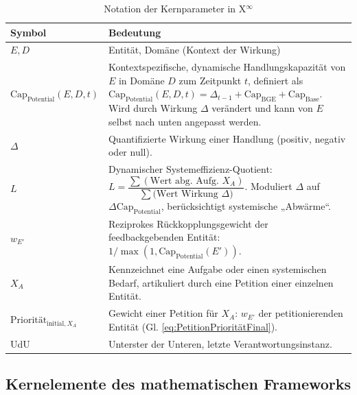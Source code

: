 \documentclass[12pt]{scrartcl}
\begin{document}
\begin{table}[ht]
\centering\caption{Notation der Kernparameter in X$^\infty$}
\begin{tabular}{p{3.0cm} >{\raggedright\arraybackslash}p{10.0cm}}
\toprule
Symbol & Bedeutung \\
\midrule
$E, D$ & Entität, Domäne (Kontext der Wirkung) \\
$\text{Cap}_{\text{Potential}}(E,D,t)$ & Kontextspezifische, dynamische Handlungskapazität von $E$ in Domäne $D$ zum Zeitpunkt $t$, definiert als $\text{Cap}_{\text{Potential}}(E,D,t) = \Delta_{t-1} + \text{Cap}_{\text{BGE}} + \text{Cap}_{\text{Base}}$. Wird durch Wirkung $\Delta$ verändert und kann von $E$ selbst nach unten angepasst werden. \\
$\Delta$ & Quantifizierte Wirkung einer Handlung (positiv, negativ oder null). \\
$L$ & Dynamischer Systemeffizienz-Quotient: $L = \dfrac{\sum (\text{Wert abg. Aufg. } X_A)}{\sum (\text{Wert Wirkung } \Delta\text{)}}$. Moduliert $\Delta$ auf $\Delta\text{Cap}_{\text{Potential}}$, berücksichtigt systemische „Abwärme“. \\
$w_{E'}$ & Reziprokes Rückkopplungsgewicht der feedbackgebenden Entität: $1 / \max(1, \text{Cap}_{\text{Potential}}(E'))$. \\
$X_A$ & Kennzeichnet eine Aufgabe oder einen systemischen Bedarf, artikuliert durch eine Petition einer einzelnen Entität. \\
$\text{Priorität}_{\text{initial}, X_A}$ & Gewicht einer Petition für $X_A$: $w_{E'}$ der petitionierenden Entität (Gl. \eqref{eq:PetitionPrioritätFinal}). \\
UdU & Unterster der Unteren, letzte Verantwortungsinstanz. \\
\bottomrule
\end{tabular}
\end{table}

\subsection{Kernelemente des mathematischen Frameworks}
\end{document}

